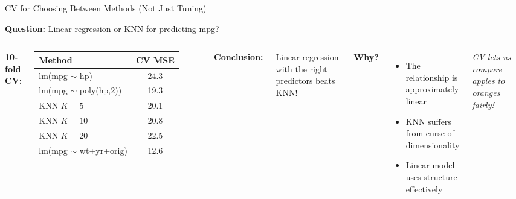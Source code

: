 \documentclass[aspectratio=169, 11pt]{beamer}
\begin{document}
\begin{frame}{CV for Choosing Between Methods (Not Just Tuning)}

\textbf{Question:} Linear regression or KNN for predicting mpg?

\vspace{0.3em}
\begin{columns}
\textbf{10-fold CV:}

\begin{tabular}{lc}
\toprule
Method & CV MSE \\
\midrule
lm(mpg $\sim$ hp) & 24.3 \\
lm(mpg $\sim$ poly(hp,2)) & 19.3 \\
KNN $K=5$ & 20.1 \\
KNN $K=10$ & 20.8 \\
KNN $K=20$ & 22.5 \\
\textcolor{softgreen}{lm(mpg $\sim$ wt+yr+orig)} & \textcolor{softgreen}{12.6} \\
\bottomrule
\end{tabular}

\textbf{Conclusion:}

Linear regression with the right predictors beats KNN!

\vspace{0.3em}
\textbf{Why?}

\begin{itemize}
  \item The relationship is approximately linear
  \item KNN suffers from curse of dimensionality
  \item Linear model uses structure effectively
\end{itemize}

\vspace{0.3em}
\textit{CV lets us compare apples to oranges fairly!}
\end{columns}
\end{frame}
\end{document}
